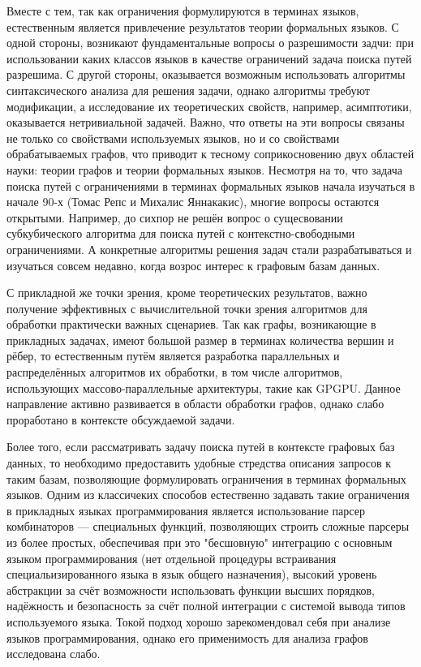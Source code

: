 \documentclass[12pt]{article}  %
\theoremstyle{remark}
\begin{document}
Вместе с тем, так как ограничения формулируются в терминах языков, естественным является привлечение результатов теории формальных языков.
С одной стороны, возникают фундаментальные вопросы о разрешимости задчи: при использовании каких классов языков в качестве ограничений задача поиска путей разрешима.
С другой стороны, оказывается возможным использовать алгоритмы синтаксического анализа для решения задачи, однако алгоритмы требуют модификации, а исследование их теоретических свойств, например, асимптотики, оказывается нетривиальной задачей.
Важно, что ответы на эти вопросы связаны не только со свойствами используемых языков, но и со свойствами обрабатываемых графов, что приводит к тесному соприкосновению двух областей науки: теории графов и теории формальных языков.
Несмотря на то, что задача поиска путей с ограничениями в терминах формальных языков начала изучаться в начале 90-х (Томас Репс и Михалис Яннакакис), многие вопросы остаются открытыми.
Например, до сихпор не решён вопрос о сущесвовании субкубического алгоритма для поиска путей с контекстно-свободными ограничениями.
А конкретные алгоритмы решения задач стали разрабатываться и изучаться совсем недавно, когда возрос интерес к графовым базам данных.

С прикладной же точки зрения, кроме теоретических результатов, важно получение эффективных с вычислительной точки зрения алгоритмов для обработки практически важных сценариев.
Так как графы, возникающие в прикладных задачах, имеют большой размер в терминах количества вершин и рёбер, то естественным путём является разработка параллельных и распределённых алгоритмов их обработки, в том числе алгоритмов, использующих массово-параллельные архитектуры, такие как GPGPU.
Данное направление активно развивается в области обработки графов, однако слабо проработано в контексте обсуждаемой задачи.

Более того, если рассматривать задачу поиска путей в контексте графовых баз данных, то необходимо предоставить удобные стредства описания запросов к таким базам, позволяющие формулировать ограничения в терминах формальных языков.
Одним из классичеких способов естественно задавать такие ограничения в прикладных языках программирования является использование парсер комбинаторов --- специальных функций, позволяющих строить сложные парсеры из более простых, обеспечивая при это "бесшовную" интеграцию с основным языком программирования (нет отдельной процедуры встраивания специальизированного языка в язык общего назначения), высокий уровень абстракции за счёт возможности использовать функции высших порядков, надёжность и безопасность за счёт полной интеграции с системой вывода типов используемого языка.
Токой подход хорошо зарекомендовал себя при анализе языков программирования, однако его применимость для анализа графов исследована слабо.
\end{document}
